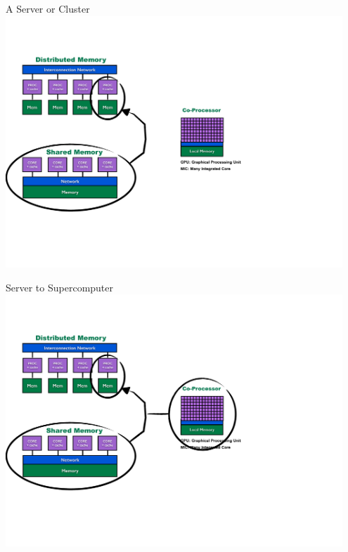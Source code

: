 \begin{frame}{A Server or Cluster}
\includegraphics[width=0.95\textwidth]
{../common/pics/hardware/ParallelHardware3.pdf}
\end{frame}

\begin{frame}{Server to Supercomputer}
\includegraphics[width=0.95\textwidth]
{../common/pics/hardware/ParallelHardware4.pdf}
\end{frame}

